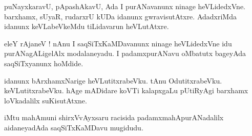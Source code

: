 \documentclass{article}
\begin{document}
\begin{mng}%
puNayxkaravU, pApashAkavU, Ada I purANavanunx ninage heVLidedxVne. barxhamx, sUyaR, rudarxrU kUDa 
idanunx gwravisutAtxre. AdadxriMda idanunx keVLabeVkeMdu tiLidavarun heVLutAtxre.
\end{mng}

\begin{mng}%
eleY rAjaneV ! nAnu I saqSiTxKaMDavanunx ninage heVLidedxVne idu purANagALigelAlx modalaneyadu. I 
padamxpurANavu oMbatutx bageyAda saqSiTxyanunx hoMdide.
\end{mng}

\begin{mng}%
idanunx bArxhamxNarige heVLutitxrabeVku. tAnu OdutitxrabeVku. keVLutitxrabeVku. hAge mADidare 
koVTi kalapxgaLu pUtiRyAgi barxhamx loVkadalilx suKisutAtxne.
\end{mng}


iMtu mahAmuni shirxVvAyxsaru racisida padamxmahApurANadalilx aidaneyadAda saqSiTxKaMDavu mugidudu.
\end{document}
